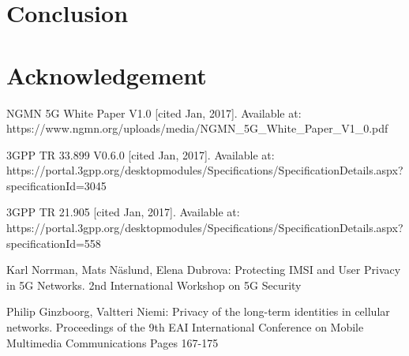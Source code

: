 \documentclass[lnicst,sechang,a4paper]{svmultln}
\begin{document}
\section{Conclusion}
\label{sec:conclusion}

\section{Acknowledgement}
\label{sec:acknowledgement}



\begin{thebibliography}{4}

 NGMN 5G White Paper V1.0 [cited Jan, 2017]. Available at: https://www.ngmn.org/uploads/media/NGMN\_5G\_White\_Paper\_V1\_0.pdf

 3GPP TR 33.899 V0.6.0 [cited Jan, 2017]. Available at: https://portal.3gpp.org/desktopmodules/Specifications/SpecificationDetails.aspx?\\specificationId=3045

 3GPP TR 21.905 [cited Jan, 2017]. Available at: https://portal.3gpp.org/desktopmodules/Specifications/SpecificationDetails.aspx?\\specificationId=558


 Karl Norrman, Mats Näslund, Elena Dubrova: Protecting IMSI and User Privacy in 5G Networks. 2nd International Workshop on 5G Security

 Philip Ginzboorg,  Valtteri Niemi: Privacy of the long-term identities in cellular networks. Proceedings of the 9th EAI International Conference on Mobile Multimedia Communications
Pages 167-175




\end{thebibliography}
\end{document}
